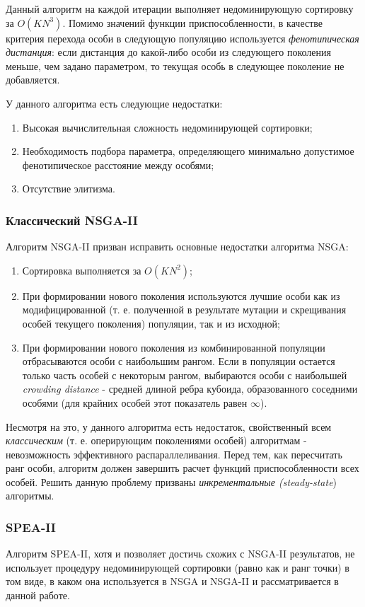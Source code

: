 Данный алгоритм на каждой итерации выполняет недоминирующую сортировку за $O(KN^3)$.
Помимо значений функции приспособленности, в качестве критерия перехода особи в следующую популяцию
используется \textit{фенотипическая дистанция}: если дистанция до какой-либо особи из следующего 
поколения меньше, чем задано параметром, то текущая особь в следующее поколение не добавляется. 
\cite{nsga1}

У данного алгоритма есть следующие недостатки: \cite{deb_nsga2}
\begin{enumerate}
\item Высокая вычислительная сложность недоминирующей сортировки;
\item Необходимость подбора параметра, определяющего минимально допустимое фенотипическое
	расстояние между особями;
\item Отсутствие элитизма.
\end{enumerate}

\subsubsection{Классический NSGA-II}
Алгоритм NSGA-II призван исправить основные недостатки алгоритма NSGA: \cite{deb_nsga2}
\begin{enumerate}
\item Сортировка выполняется за $O(KN^2)$;
\item При формировании нового поколения используются лучшие особи как из модифицированной
	(т. е. полученной в результате мутации и скрещивания особей текущего поколения) 
	популяции, так и из исходной;
\item При формировании нового поколения из комбинированной популяции отбрасываются особи
	с наибольшим рангом. Если в популяции остается только часть особей с некоторым рангом,
	выбираются особи с наибольшей \textit{crowding distance} - средней длиной ребра кубоида,
	образованного соседними особями (для крайних особей этот показатель равен $\infty$).
\end{enumerate}

Несмотря на это, у данного алгоритма есть недостаток, свойственный всем \textit{классическим}
(т. е. оперирующим поколениями особей) алгоритмам - невозможность эффективного распараллеливания.
Перед тем, как пересчитать ранг особи, алгоритм должен завершить расчет функций приспособленности 
всех особей. Решить данную проблему призваны \textit{инкрементальные (steady-state}) алгоритмы.
\cite{max_me_ss_nsga2}

\subsubsection{SPEA-II}
Алгоритм SPEA-II, хотя и позволяет достичь схожих с NSGA-II результатов, не использует процедуру 
недоминирующей сортировки (равно как и ранг точки) в том виде, в каком она используется в NSGA и 
NSGA-II и рассматривается в данной работе.

